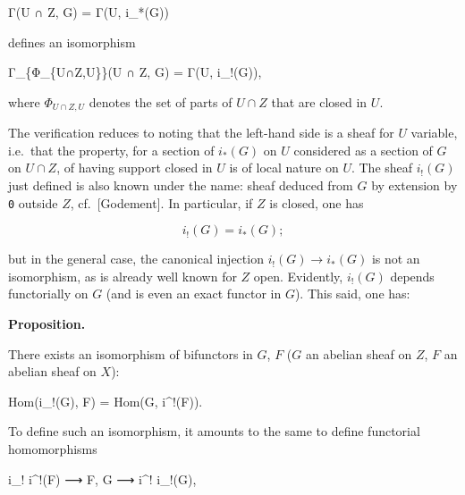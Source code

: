 \documentclass[
]{article}
\newenvironment{Shaded}{}{}
\newcommand{\NormalTok}[1]{#1}
\begin{document}
\begin{Shaded}
\begin{Highlighting}[]
\NormalTok{Γ(U ∩ Z, G) = Γ(U, i\_*(G))}
\end{Highlighting}
\end{Shaded}

defines an isomorphism

\begin{Shaded}
\begin{Highlighting}[]
\NormalTok{Γ\_\{Φ\_\{U∩Z,U\}\}(U ∩ Z, G) = Γ(U, i\_!(G)),}
\end{Highlighting}
\end{Shaded}

where \(\Phi_{U\cap Z,U}\) denotes the set of parts of \(U \cap Z\) that
are closed in \(U\).

The verification reduces to noting that the left-hand side is a sheaf
for \(U\) variable, i.e.~that the property, for a section of
\(i_{*}(G)\) on \(U\) considered as a section of \(G\) on \(U \cap Z\),
of having support closed in \(U\) is of local nature on \(U\). The sheaf
\(i_{!}(G)\) just defined is also known under the name: sheaf deduced
from \(G\) by extension by \texttt{0} outside \(Z\), cf.~{[}Godement{]}.
In particular, if \(Z\) is closed, one has

\[
i_{!}(G) = i_{*}(G);
\]

but in the general case, the canonical injection
\(i_{!}(G) \to i_{*}(G)\) is not an isomorphism, as is already well
known for \(Z\) open. Evidently, \(i_{!}(G)\) depends functorially on
\(G\) (and is even an exact functor in \(G\)). This said, one has:

\textbf{Proposition.}

There exists an isomorphism of bifunctors in \(G\), \(F\) (\(G\) an
abelian sheaf on \(Z\), \(F\) an abelian sheaf on \(X\)):

\begin{Shaded}
\begin{Highlighting}[]
\NormalTok{Hom(i\_!(G), F) = Hom(G, i\^{}!(F)).}
\end{Highlighting}
\end{Shaded}

To define such an isomorphism, it amounts to the same to define
functorial homomorphisms

\begin{Shaded}
\begin{Highlighting}[]
\NormalTok{i\_! i\^{}!(F) ⟶ F, G ⟶ i\^{}! i\_!(G),}
\end{Highlighting}
\end{Shaded}
\end{document}
